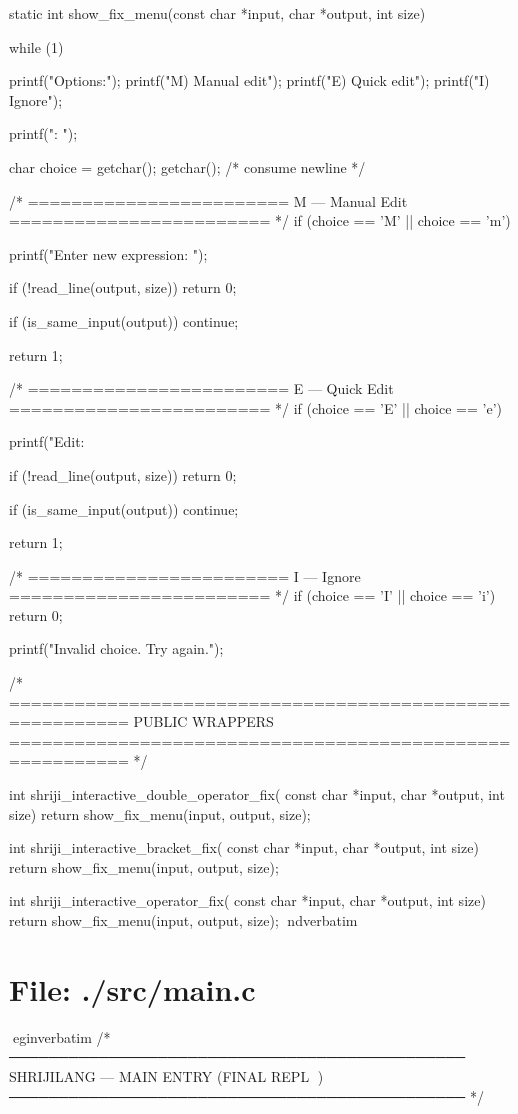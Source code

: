 \documentclass{article}
\begin{document}
static int show_fix_menu(const char *input, char *output, int size)
{
    while (1)
    {
        printf("\nFix Options:\n\n");
        printf("M) Manual edit\n");
        printf("E) Quick edit\n");
        printf("I) Ignore\n");

        printf("\nSelect: ");

        char choice = getchar();
        getchar(); /* consume newline */

        /* ========================
           M — Manual Edit
        ======================== */
        if (choice == 'M' || choice == 'm')
        {
            printf("Enter new expression: ");

            if (!read_line(output, size))
                return 0;

            if (is_same_input(output))
                continue;

            return 1;
        }

        /* ========================
           E — Quick Edit
        ======================== */
        if (choice == 'E' || choice == 'e')
        {
            printf("Edit:\n%

            if (!read_line(output, size))
                return 0;

            if (is_same_input(output))
                continue;

            return 1;
        }

        /* ========================
           I — Ignore
        ======================== */
        if (choice == 'I' || choice == 'i')
        {
            return 0;
        }

        printf("Invalid choice. Try again.\n");
    }
}

/* =========================================================
   PUBLIC WRAPPERS
========================================================= */

int shriji_interactive_double_operator_fix(
    const char *input,
    char *output,
    int size)
{
    return show_fix_menu(input, output, size);
}

int shriji_interactive_bracket_fix(
    const char *input,
    char *output,
    int size)
{
    return show_fix_menu(input, output, size);
}

int shriji_interactive_operator_fix(
    const char *input,
    char *output,
    int size)
{
    return show_fix_menu(input, output, size);
}
nd{verbatim}
\section*{File: ./src/main.c}
egin{verbatim}
/*
──────────────────────────────────────────────
    SHRIJILANG — MAIN ENTRY (FINAL REPL 🌸)
──────────────────────────────────────────────
*/
\end{document}
